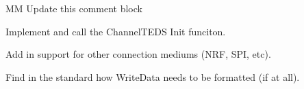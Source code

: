 \begin{DoxyRefList}
M\+M Update this comment block  
\item[\label{todo__todo000039}%
\hypertarget{todo__todo000039}{}%
global\+Scope$>$ Global \hyperlink{_t_i_m___core_8h_a9caa1e61ee11742e57bfa36da2c187a8}{T\+I\+M\+\_\+\+Init} (void)]Implement and call the Channel\+T\+E\+D\+S Init funciton. 

Add in support for other connection mediums (N\+R\+F, S\+P\+I, etc).  
\item[\label{todo__todo000037}%
\hypertarget{todo__todo000037}{}%
global\+Scope$>$ Global \hyperlink{_t_i_m1_8h_a03b0af099ef9f2bc44533b90d00d7cbd}{Write\+Channel\+Transducer\+Data} (char $\ast$\+Channel\+I\+D, int Write\+Data)]Find in the standard how Write\+Data needs to be formatted (if at all). 
\end{DoxyRefList}